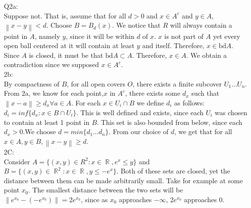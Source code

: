 \documentclass[letterpaper]{article}
\DeclareMathOperator{\R}{\mathbb{R}}
\newcommand{\norm}[1]{\left\lVert#1\right\rVert}
\begin{document}
Q2a: \\
Suppose not. That is, assume that for all $d >0$ and $x \in A^c $ and $y \in A$, $\norm{x-y} < d$.
 Choose $B = B_{d}(x)$.  We notice that $R$ will always contain a point in $A$, namely $y$, since it will be within $d$ of $x$. $x$ is not part of $A$ yet every open ball centered at it will contain at least $y$ and itself. Therefore, $x\in \text{bd} A$. Since $A$ is closed, it must be that $\text{bd}A \subset A$. Therefore, $x\in A$. We obtain a contradiction since we supposed $x \in A^c$. 
\\
 2b:
 \\
 By compactness of $B$, for all open covers $O$, there exists a finite subcover $U_1 \dots U_n$. From 2a, we know for each point,$x$ in $A^c$, there exists some $d_x$ such that $\norm{x-a} \geq d_x \forall a\in A$. For each $x\in U_i \cap B$ we define $d_i$ as follows: $d_i = inf \{d_x : x \in B \cap U_i \}$. This is well defined and exists, since each $U_i$ was chosen to contain at least 1 point in $B$. This set is also bounded from below, since each $d_x >0$.We choose $d= min\{d_1 \dots d_n\}$. From our choice of $d$, we get that for all $x\in A, y\in B , \norm{x-y}\geq d$.
 \\
 2C:
\\
 Consider $A= \{(x,y) \in R^2 :x\in \R,  e^x \leq y \}$ and $B= \{ (x,y)\in \R^2: x\in \R , y \leq -e^x\}$. Both of these sets are closed, yet the distance between them can be made arbitrarily small. Take for example at some point $x_0$. The smallest distance between the two sets will be $\norm{e^{x_0}-(-e^{x_0})} = 2e^{x_0}$, since as $x_0$ approaches $-\infty$, $2e^{x_0}$ approaches $0$.
\end{document}
